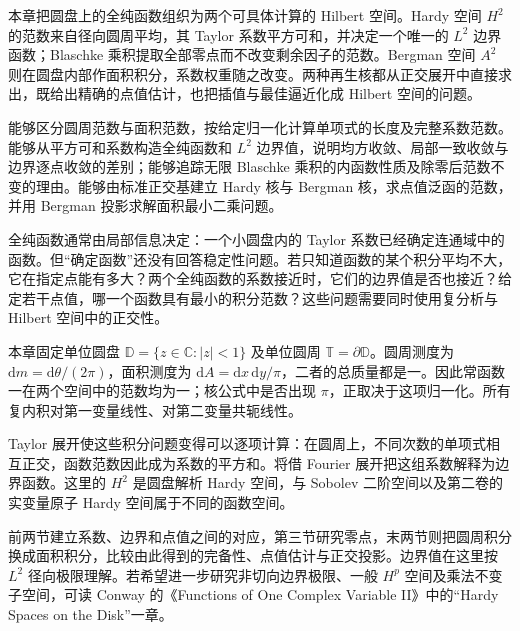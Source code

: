 
\begin{chapterabstract}
本章把圆盘上的全纯函数组织为两个可具体计算的 Hilbert 空间。Hardy 空间 \(H^2\) 的范数来自径向圆周平均，其 Taylor 系数平方可和，并决定一个唯一的 \(L^2\) 边界函数；Blaschke 乘积提取全部零点而不改变剩余因子的范数。Bergman 空间 \(A^2\) 则在圆盘内部作面积积分，系数权重随之改变。两种再生核都从正交展开中直接求出，既给出精确的点值估计，也把插值与最佳逼近化成 Hilbert 空间的问题。
\end{chapterabstract}

\begin{learninggoals}
能够区分圆周范数与面积范数，按给定归一化计算单项式的长度及完整系数范数。能够从平方可和系数构造全纯函数和 \(L^2\) 边界值，说明均方收敛、局部一致收敛与边界逐点收敛的差别；能够追踪无限 Blaschke 乘积的内函数性质及除零后范数不变的理由。能够由标准正交基建立 Hardy 核与 Bergman 核，求点值泛函的范数，并用 Bergman 投影求解面积最小二乘问题。
\end{learninggoals}

全纯函数通常由局部信息决定：一个小圆盘内的 Taylor 系数已经确定连通域中的函数。但“确定函数”还没有回答稳定性问题。若只知道函数的某个积分平均不大，它在指定点能有多大？两个全纯函数的系数接近时，它们的边界值是否也接近？给定若干点值，哪一个函数具有最小的积分范数？这些问题需要同时使用复分析与 Hilbert 空间中的正交性。

\ProseParagraphBreak

本章固定单位圆盘 \(\mathbb D=\{z\in\mathbb C:|z|<1\}\) 及单位圆周 \(\mathbb T=\partial\mathbb D\)。圆周测度为 \(\mathrm dm=\mathrm d\theta/(2\pi)\)，面积测度为 \(\mathrm dA=\mathrm dx\,\mathrm dy/\pi\)，二者的总质量都是一。因此常函数一在两个空间中的范数均为一；核公式中是否出现 \(\pi\)，正取决于这项归一化。所有复内积对第一变量线性、对第二变量共轭线性。

\ProseParagraphBreak

Taylor 展开使这些积分问题变得可以逐项计算：在圆周上，不同次数的单项式相互正交，函数范数因此成为系数的平方和。将借 Fourier 展开把这组系数解释为边界函数。这里的 \(H^2\) 是圆盘解析 Hardy 空间，与 Sobolev 二阶空间以及第二卷的实变量原子 Hardy 空间属于不同的函数空间。

\ProseParagraphBreak

前两节建立系数、边界和点值之间的对应，第三节研究零点，末两节则把圆周积分换成面积积分，比较由此得到的完备性、点值估计与正交投影。边界值在这里按 \(L^2\) 径向极限理解。若希望进一步研究非切向边界极限、一般 \(H^p\) 空间及乘法不变子空间，可读 Conway 的《Functions of One Complex Variable II》\cite[pp.~269--299]{Conway1995Functions}中的“Hardy Spaces on the Disk”一章。

